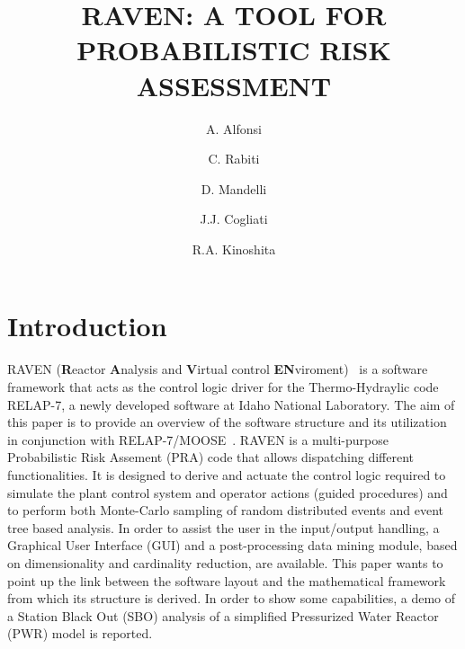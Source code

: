 \documentclass{anstrans}
\title{RAVEN: A TOOL FOR PROBABILISTIC RISK ASSESSMENT}
\author{A. Alfonsi \and  C. Rabiti \and D. Mandelli \and J.J. Cogliati \and R.A. Kinoshita}
\institute{
Idaho National Laboratory
}
\begin{document}
  \twocolumn[
    \begin{@twocolumnfalse}
        \maketitle
    \end{@twocolumnfalse}
  ]

\section{Introduction}
RAVEN (\textbf{R}eactor \textbf{A}nalysis and \textbf{V}irtual control \textbf{EN}viroment)~\cite{ravenFY12,mandelliANS2012} is a software framework that acts as the control logic driver for the Thermo-Hydraylic code RELAP-7, a newly developed software at Idaho National Laboratory. The aim of this paper is to provide an overview of the software structure and its utilization in conjunction with RELAP-7/MOOSE~\cite{MOOSE,relap7FY12}. RAVEN is a multi-purpose Probabilistic Risk Assement (PRA) code that allows dispatching different functionalities. 
It is designed to derive and actuate the control logic required to simulate the plant control system and operator actions (guided procedures) and to perform both Monte-Carlo sampling of random distributed events and event tree based analysis. 
In order to assist the user in the input/output handling, a Graphical User Interface (GUI) and a post-processing data mining module, based on dimensionality and cardinality reduction, are available.
This paper wants to point up the link between the software layout and the mathematical framework from which its structure is derived. In order to show some capabilities, a demo of a Station Black Out (SBO) analysis of a simplified Pressurized Water Reactor (PWR) model is reported.
\end{document}
